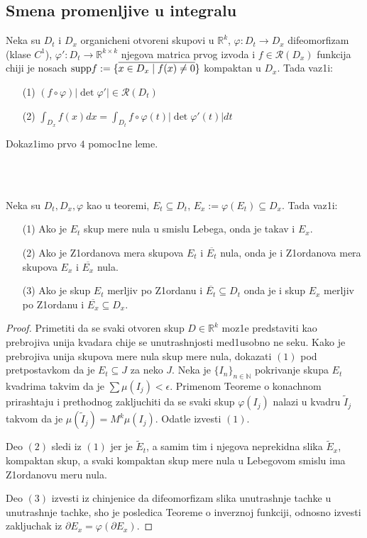 \documentclass[a4paper,12pt]{article}
\newcommand{\latin}{\fontencoding{T1}\selectfont}
\newcommand{\NN}{\mathbb{N}}
\newcommand{\RR}{\mathbb{R}}
\begin{document}
\subsection{Smena promenljive u integralu}

\begin{tma}
Neka su $D_t$ i $D_x$ organicheni otvoreni skupovi u $\RR^k$, $\varphi: D_t \to D_x$ difeomorfizam (klase $C^1$), $\varphi ' : D_t \to \RR^{k \times k}$ njegova matrica prvog izvoda i $f \in \mathcal R (D_x)$ funkcija chiji je nosach $\latin{\textrm{supp}} f := \{\overline{x \in D_x \mid f(x) \ne 0 }\}$ kompaktan u $D_x$. Tada vaz1i:
\begin{itemize}
\item[(1)] $(f \circ \varphi) |\det \varphi ' | \in \mathcal R(D_t)$
\item[(2)] $\int_{D_x} f(x) dx = \int_{D_t} f \circ \varphi(t) |\det \varphi ' (t)| dt$
\end{itemize}
\end{tma}
\begin{nap}
Dokaz1imo prvo $4$ pomoc1ne leme.
\end{nap}
\\ \\
\begin{lema}
Neka su $D_t, D_x, \varphi$ kao u teoremi, $E_t \subseteq D_t$, $E_x := \varphi(E_t) \subseteq D_x$. Tada vaz1i:
\begin{itemize}
\item[(1)] Ako je $E_t$ skup mere nula u smislu Lebega, onda je takav i $E_x$.
\item[(2)] Ako je Z1ordanova mera skupova $E_t$ i $\overline{E_t}$ nula, onda je i Z1ordanova mera skupova $E_x$ i $\overline{E_x}$ nula.
\item[(3)] Ako je skup $E_t$ merljiv po Z1ordanu i $\overline{E_t} \subseteq D_t$ onda je i skup $E_x$ merljiv po Z1ordanu i $\overline{E_x} \subseteq D_x$.
\end{itemize}
\end{lema}
\begin{proof}
Primetiti da se svaki otvoren skup $D \in \RR^k$ moz1e predstaviti kao prebrojiva unija kvadara chije se unutrashnjosti med1usobno ne seku. Kako je prebrojiva unija skupova mere nula skup mere nula, dokazati $(1)$ pod pretpostavkom da je $E_t \subseteq J$ za neko $J$. Neka je $\{ I_n \}_{n \in \NN}$ pokrivanje skupa $E_t$ kvadrima takvim da je $\sum \mu (I_j) < \epsilon$. Primenom Teoreme o konachnom prirashtaju i prethodnog zakljuchiti da se svaki skup $\varphi (I_j) $ nalazi u kvadru $\tilde{I}_j $ takvom da je $\mu (\tilde{I}_j) = M^k \mu (I_j)$. Odatle izvesti $(1)$. 

Deo $(2)$ sledi iz $(1)$ jer je $\tilde{E}_t$, a samim tim i njegova neprekidna slika $\tilde{E}_x$, kompaktan skup, a svaki kompaktan skup mere nula u Lebegovom smislu ima Z1ordanovu meru nula.

Deo $(3)$ izvesti iz chinjenice da difeomorfizam slika unutrashnje tachke u unutrashnje tachke, sho je posledica Teoreme o inverznoj funkciji, odnosno izvesti zakljuchak iz $\partial E_x = \varphi (\partial E_x)$.
\end{proof}
\end{document}
